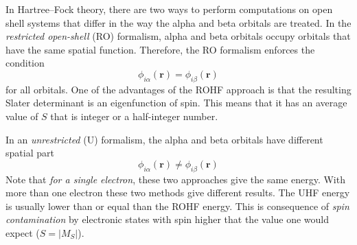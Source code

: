 \documentclass[../Main/chem371-notes.tex]{subfiles}
\begin{document}
In Hartree--Fock theory, there are two ways to perform computations on open shell systems that differ in the way the alpha and beta orbitals are treated.
In the \emph{restricted open-shell} (RO) formalism, alpha and beta orbitals occupy orbitals that have the same spatial function. Therefore, the RO formalism enforces the condition
\begin{equation}
\phi_{i\alpha}(\mathbf{r}) = \phi_{i\beta}(\mathbf{r})
\end{equation}
for all orbitals.
One of the advantages of the ROHF approach is that the resulting Slater determinant is an eigenfunction of spin.
This means that it has an average value of $S$ that is integer or a half-integer number.

In an \emph{unrestricted} (U) formalism, the alpha and beta orbitals have different spatial part
\begin{equation}
\phi_{i\alpha}(\mathbf{r}) \neq \phi_{i\beta}(\mathbf{r})
\end{equation}
Note that \emph{for a single electron}, these two approaches give the same energy.
With more than one electron these two methods give different results.
The UHF energy is usually lower than or equal than the ROHF energy.
This is consequence of \emph{spin contamination} by electronic states with spin higher that the value one would expect ($S = |M_S|$).



\end{document}

